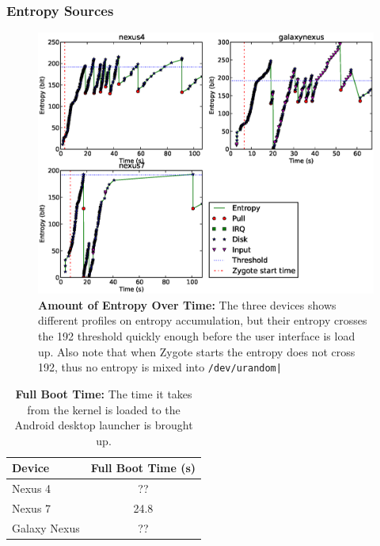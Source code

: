 \subsubsection{Entropy Sources}
\begin{figure}[t]
\begin{center}
\includegraphics[scale=0.6]{entropy.eps}
\end{center}
\caption{{\bf Amount of Entropy Over Time:} The three devices shows different profiles on entropy accumulation, but their entropy crosses the 192 threshold quickly enough before the user interface is load up. Also note that when Zygote starts the entropy does not cross 192, thus no entropy is mixed into \texttt{/dev/urandom|}   }
\label{figentropy}
\end{figure}

\begin{table}
\begin{center}
\begin{tabular}{|l|c|}
\hline
\bf Device & \bf Full Boot Time (s) \\
\hline
Nexus 4 & ?? \\
\hline
Nexus 7 & 24.8 \\
\hline
Galaxy Nexus & ??\\
\hline

\end{tabular}
\end{center}
\caption{{\bf Full Boot Time:} The time it takes from the kernel is loaded to the Android desktop launcher is brought up.}
\label{tblboottime}
\end{table}

